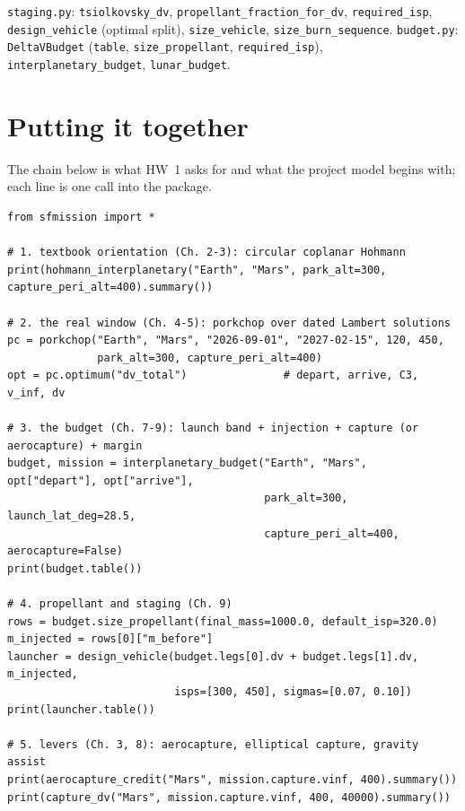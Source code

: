 \documentclass[11pt,letterpaper,oneside]{report}
\newcommand{\code}[1]{\texttt{#1}}
\begin{document}
\begin{codebox}
\code{staging.py}: \code{tsiolkovsky\_dv}, \code{propellant\_fraction\_for\_dv}, \code{required\_isp},
\code{design\_vehicle} (optimal split), \code{size\_vehicle}, \code{size\_burn\_sequence}.
\code{budget.py}: \code{DeltaVBudget} (\code{table}, \code{size\_propellant}, \code{required\_isp}),
\code{interplanetary\_budget}, \code{lunar\_budget}.
\end{codebox}

\chapter{Putting it together}\label{ch:walkthrough}
The chain below is what HW~1 asks for and what the project model begins with; each line is one
call into the package.

\begin{lstlisting}
from sfmission import *

# 1. textbook orientation (Ch. 2-3): circular coplanar Hohmann
print(hohmann_interplanetary("Earth", "Mars", park_alt=300, capture_peri_alt=400).summary())

# 2. the real window (Ch. 4-5): porkchop over dated Lambert solutions
pc = porkchop("Earth", "Mars", "2026-09-01", "2027-02-15", 120, 450,
              park_alt=300, capture_peri_alt=400)
opt = pc.optimum("dv_total")               # depart, arrive, C3, v_inf, dv

# 3. the budget (Ch. 7-9): launch band + injection + capture (or aerocapture) + margin
budget, mission = interplanetary_budget("Earth", "Mars", opt["depart"], opt["arrive"],
                                        park_alt=300, launch_lat_deg=28.5,
                                        capture_peri_alt=400, aerocapture=False)
print(budget.table())

# 4. propellant and staging (Ch. 9)
rows = budget.size_propellant(final_mass=1000.0, default_isp=320.0)
m_injected = rows[0]["m_before"]
launcher = design_vehicle(budget.legs[0].dv + budget.legs[1].dv, m_injected,
                          isps=[300, 450], sigmas=[0.07, 0.10])
print(launcher.table())

# 5. levers (Ch. 3, 8): aerocapture, elliptical capture, gravity assist
print(aerocapture_credit("Mars", mission.capture.vinf, 400).summary())
print(capture_dv("Mars", mission.capture.vinf, 400, 40000).summary())
\end{lstlisting}
\end{document}

